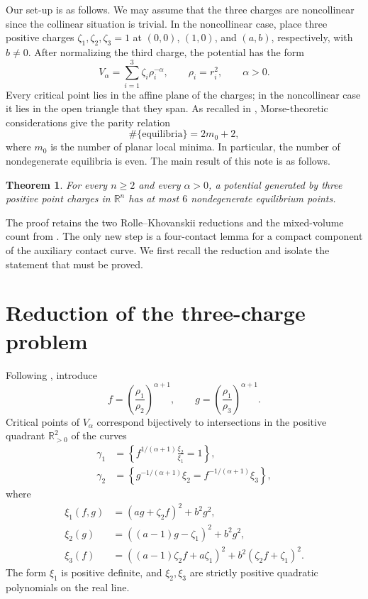\documentclass[10pt,reqno]{amsart}
\numberwithin{equation}{section}
\theoremstyle{plain}
\newtheorem{theorem}{Theorem}[section]
\theoremstyle{remark}
\newcommand{\R}{\mathbb{R}}
\newcommand{\Qpos}{\R_{>0}^{2}}
\begin{document}
Our set-up is as follows. We may assume that the three charges are noncollinear since the collinear situation is trivial.  In the noncollinear case, place three positive
charges $\zeta_1,\zeta_2,\zeta_3=1$ at $(0,0)$, $(1,0)$, and $(a,b)$,
respectively, with $b\neq0$.  After normalizing the third charge, the
potential has the form
\begin{equation}\label{eq:potential}
  V_{\alpha}=\sum_{i=1}^{3}\zeta_i\rho_i^{-\alpha},
  \qquad
  \rho_i=r_i^2,
  \qquad
  \alpha>0.
\end{equation}
Every critical point lies in the affine plane of the charges; in the
noncollinear case it lies in the open triangle that they span.  As
recalled in \cite{GNS}, Morse-theoretic considerations give the parity
relation
\begin{equation}\label{eq:parity}
  \#\{\text{equilibria}\}=2m_0+2,
\end{equation}
where $m_0$ is the number of planar local minima.  In particular, the
number of nondegenerate equilibria is even.  The main result of this note is as follows. 

\begin{theorem}\label{thm:main}
For every $n\geq2$ and every $\alpha>0$, a potential generated by three
positive point charges in $\R^n$ has at most $6$ nondegenerate equilibrium
points.
\end{theorem}

The proof retains the two Rolle--Khovanskii reductions and the
mixed-volume count from \cite{GNS}.  The only new step is a four-contact
lemma for a compact component of the auxiliary contact curve.  We first
recall the reduction and isolate the statement that must be proved.

\section{Reduction of the three-charge problem}\label{sec:reduction}

Following \cite{GNS}, introduce
\begin{equation}\label{eq:fg}
  f=\left(\frac{\rho_1}{\rho_2}\right)^{\alpha+1},
  \qquad
  g=\left(\frac{\rho_1}{\rho_3}\right)^{\alpha+1}.
\end{equation}
Critical points of $V_{\alpha}$ correspond bijectively to intersections
in the positive quadrant $\Qpos$ of the curves
\begin{align}
  \gamma_1
    &=\left\{
      f^{1/(\alpha+1)}\frac{\xi_2}{\xi_1}=1
      \right\},
      \label{eq:gamma1}\\
  \gamma_2
    &=\left\{
      g^{-1/(\alpha+1)}\xi_2
      =f^{-1/(\alpha+1)}\xi_3
      \right\},
      \label{eq:gamma2}
\end{align}
where
\begin{align}
  \xi_1(f,g)
    &=(ag+\zeta_2f)^2+b^2g^2,
    \label{eq:xi1}\\
  \xi_2(g)
    &=((a-1)g-\zeta_1)^2+b^2g^2,
    \label{eq:xi2}\\
  \xi_3(f)
    &=((a-1)\zeta_2f+a\zeta_1)^2
      +b^2(\zeta_2f+\zeta_1)^2.
    \label{eq:xi3}
\end{align}
The form $\xi_1$ is positive definite, and $\xi_2,\xi_3$ are strictly
positive quadratic polynomials on the real line.
\end{document}
